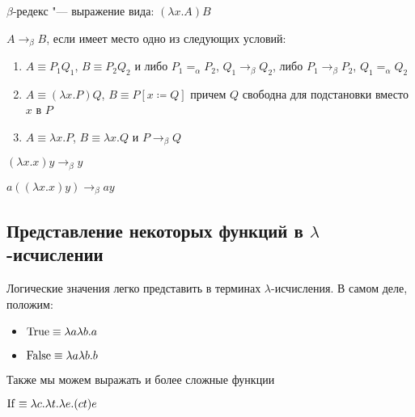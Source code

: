 \begin{definition}
	$\beta$-редекс "--- выражение вида: $\left(\lambda{}x.A\right)B$
\end{definition}

\begin{definition}
	$A\to_{\beta}B$, если имеет место одно из следующих условий:
	\begin{enumerate}
		\item $A\equiv{}P_{1}Q_{1}$, $B\equiv{}P_{2}Q_{2}$ и либо $P_{1}=_{\alpha}P_{2}$, $Q_{1}\to_{\beta}Q_{2}$, либо
		$P_{1}\to_{\beta}P_{2}$, $Q_{1}=_{\alpha}Q_{2}$
		\item $A\equiv\left(\lambda{}x.P\right) Q$, $B\equiv P[x\coloneqq{}Q]$ причем $Q$ свободна для подстановки вместо $x$ в $P$ 
		\item $A\equiv\lambda{}x.P$, $B\equiv\lambda{}x.Q$ и $P\to_{\beta}Q$
	\end{enumerate}
	\begin{example} 
		$\left(\lambda{}x.x\right) y\to_{\beta} y$
	\end{example}
	\begin{example}
		 $a \left(\left(\lambda{}x.x\right) y\right)\to_{\beta} a y$
	\end{example}
\end{definition}

\subsection{Представление некоторых функций в $\lambda$-исчислении}
Логические значения легко представить в терминах $\lambda$-исчисления. В самом деле, положим:
\begin{itemize}
	\item $\operatorname{True}  \equiv \lambda{}a\lambda{}b.a$ 
	\item $\operatorname{False} \equiv \lambda{}a\lambda{}b.b$
\end{itemize}

\newcommand{\If}{\lambda{}c.\lambda{}t.\lambda{}e.(c t) e}
\newcommand{\T}{\lambda{}a\lambda{}b.a}
\newcommand{\F}{\lambda{}a\lambda{}b.b}
\newcommand{\Fl}{\func{F}}
\newcommand{\Tl}{\func{T}}


Также мы можем выражать и более сложные функции \\


\begin{definition}
	$\func{If} \equiv \If$
\end{definition}

